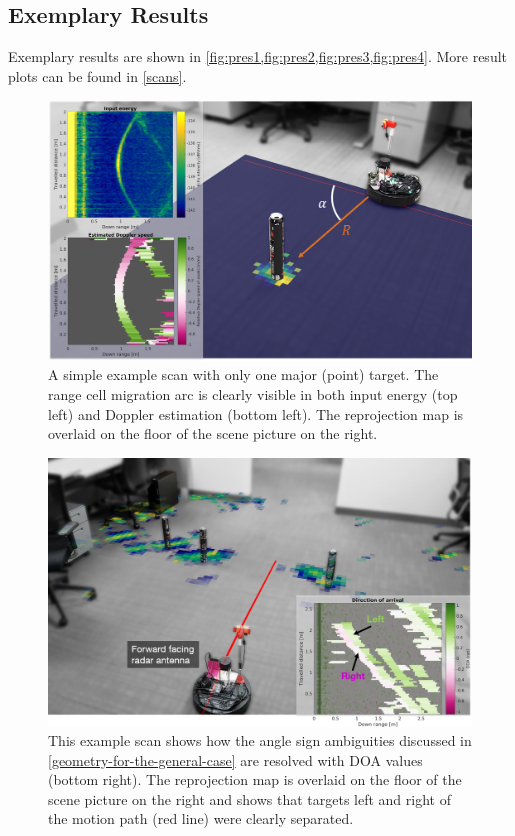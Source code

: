 \subsection{Exemplary Results}
Exemplary results are shown in \cref{fig:pres1,fig:pres2,fig:pres3,fig:pres4}. More result plots can be found in \cref{scans}.

\begin{figure}[htbp]
    \centering
    \includegraphics[max width=\textwidth]{gfx/diagrams/presentationscan1.png}
    \caption{A simple example scan with only one major (point) target. The range cell migration arc is clearly visible in both input energy (top left) and Doppler estimation (bottom left). The reprojection map is overlaid on the floor of the scene picture on the right.}
    \label{fig:pres1}
\end{figure}

\begin{figure}[htbp]
    \centering
    \includegraphics[max width=\textwidth]{gfx/diagrams/presentationscan_2.png}
    \caption{This example scan shows how the angle sign ambiguities discussed in \cref{geometry-for-the-general-case} are resolved with DOA values (bottom right). The reprojection map is overlaid on the floor of the scene picture on the right and shows that targets left and right of the motion path (red line) were clearly separated.}
    \label{fig:pres2}
\end{figure}

